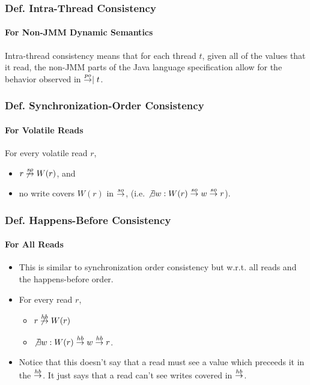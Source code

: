 \begin{frame}
    \frametitle{\textbf{Def.} Intra-Thread Consistency}
    \framesubtitle{For Non-JMM Dynamic Semantics}

    Intra-thread consistency means that for each thread $t$, given all of the
    values that it read, the non-JMM parts of the Java language specification
    allow for the behavior observed in $\overset{po}{\rightarrow} \mid t$.
\end{frame}

\begin{frame}
    \frametitle{\textbf{Def.} Synchronization-Order Consistency}
    \framesubtitle{For Volatile Reads}

    For every volatile read $r$,
    \begin{itemize}[itemsep=0.3em]
        \item $r \not \overset{so}{\rightarrow} W(r)$, and
        \item no write covers $W(r)$ in $\overset{so}{\rightarrow}$,
              (i.e. $\not\exists w: W(r) \overset{so}{\rightarrow} w \overset{so}{\rightarrow} r$).
    \end{itemize}
\end{frame}

\begin{frame}
    \frametitle{\textbf{Def.} Happens-Before Consistency}
    \framesubtitle{For All Reads}

    \begin{itemize}
        \item This is similar to synchronization order consistency but w.r.t.
              all reads and the happens-before order.

        \item For every read $r$,
        \begin{itemize}[itemsep=0.3em]
            \item $r \not \overset{hb}{\rightarrow} W(r)$
            \item $\not\exists w: W(r) \overset{hb}{\rightarrow} w \overset{hb}{\rightarrow} r$.
        \end{itemize}

        \item Notice that this doesn't say that a read must see a value which
              preceeds it in the $\overset{hb}{\rightarrow}$. It just says that a read can't see
              writes covered in $\overset{hb}{\rightarrow}$.
    \end{itemize}

\end{frame}

